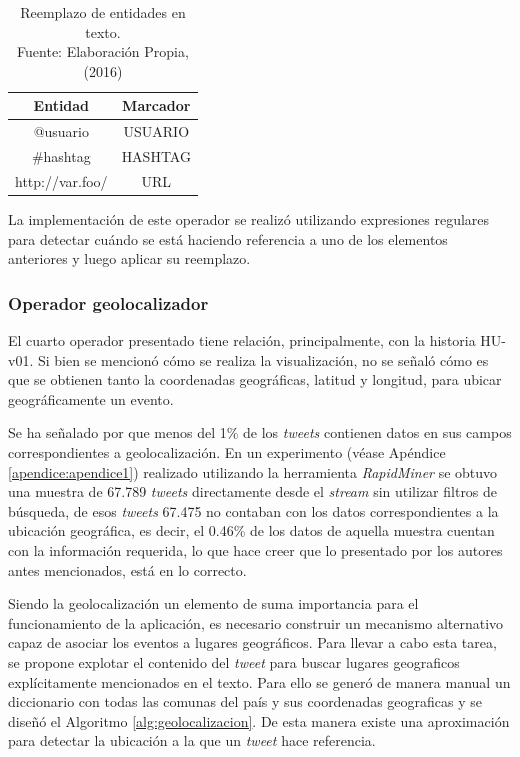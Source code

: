 \begin{table}[H]
\centering
\caption[Reemplazo de entidades en texto.]{Reemplazo de entidades en texto.\\Fuente: Elaboración Propia, (2016)}
\label{tab:reemplazosDeEntidades}
\begin{tabular}{|c|c|}
\hline
\textbf{Entidad} & \textbf{Marcador} \\ \hline
@usuario         & USUARIO            \\ \hline
\#hashtag        & HASHTAG            \\ \hline
http://var.foo/  & URL                \\ \hline
\end{tabular}
\end{table}

La implementación de este operador se realizó utilizando expresiones regulares para detectar cuándo se está haciendo referencia a uno de los elementos anteriores y luego aplicar su reemplazo.

\subsubsection*{Operador geolocalizador}
\label{subsubsec:4op}

El cuarto operador presentado tiene relación, principalmente, con la historia HU-v01. Si bien se mencionó cómo se realiza la visualización, no se señaló cómo es que se obtienen tanto la coordenadas geográficas, latitud y longitud, para ubicar geográficamente un evento.

Se ha señalado por \cite{ChatoSurvey} que menos del 1\% de los \textit{tweets} contienen datos en sus campos correspondientes a geolocalización. En un experimento (véase Apéndice \ref{apendice:apendice1}) realizado utilizando la herramienta \textit{RapidMiner} se obtuvo una muestra de 67.789 \textit{tweets} directamente desde el \textit{stream} sin utilizar filtros de búsqueda, de esos \textit{tweets} 67.475 no contaban con los datos correspondientes a la ubicación geográfica, es decir, el 0.46\% de los datos de aquella muestra cuentan con la información requerida, lo que hace creer que lo presentado por los autores antes mencionados, está en lo correcto.

Siendo la geolocalización un elemento de suma importancia para el funcionamiento de la aplicación, es necesario construir un mecanismo alternativo capaz de asociar los eventos a lugares geográficos. Para llevar a cabo esta tarea, se propone explotar el contenido del \textit{tweet} para buscar lugares geograficos explícitamente mencionados en el texto. Para ello se generó de manera manual un diccionario con todas las comunas del país y sus coordenadas geograficas y se diseñó el Algoritmo \ref{alg:geolocalizacion}. De esta manera existe una aproximación para detectar la ubicación a la que un \textit{tweet} hace referencia.\\

